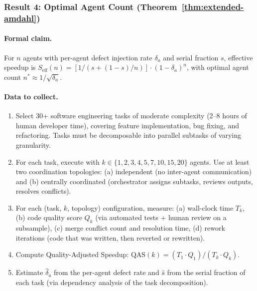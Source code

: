 \documentclass[11pt, a4paper]{googledeepmind}
\begin{document}
\subsubsection{Result 4: Optimal Agent Count (Theorem~\ref{thm:extended-amdahl})}

\paragraph{Formal claim.} For $n$ agents with per-agent defect injection rate $\delta_a$ and serial fraction $s$, effective speedup is $S_{\text{eff}}(n) = [1/(s + (1-s)/n)] \cdot (1-\delta_a)^n$, with optimal agent count $n^* \approx 1/\sqrt{\delta_a}$.

\paragraph{Data to collect.}
\begin{enumerate}[nosep]
    \item Select 30+ software engineering tasks of moderate complexity (2--8 hours of human developer time), covering feature implementation, bug fixing, and refactoring. Tasks must be decomposable into parallel subtasks of varying granularity.
    \item For each task, execute with $k \in \{1, 2, 3, 4, 5, 7, 10, 15, 20\}$ agents. Use at least two coordination topologies: (a) independent (no inter-agent communication) and (b) centrally coordinated (orchestrator assigns subtasks, reviews outputs, resolves conflicts).
    \item For each (task, $k$, topology) configuration, measure: (a) wall-clock time $T_k$, (b) code quality score $Q_k$ (via automated tests + human review on a subsample), (c) merge conflict count and resolution time, (d) rework iterations (code that was written, then reverted or rewritten).
    \item Compute Quality-Adjusted Speedup: $\text{QAS}(k) = (T_1 \cdot Q_1) / (T_k \cdot Q_k)$.
    \item Estimate $\hat{\delta}_a$ from the per-agent defect rate and $\hat{s}$ from the serial fraction of each task (via dependency analysis of the task decomposition).
\end{enumerate}
\end{document}
